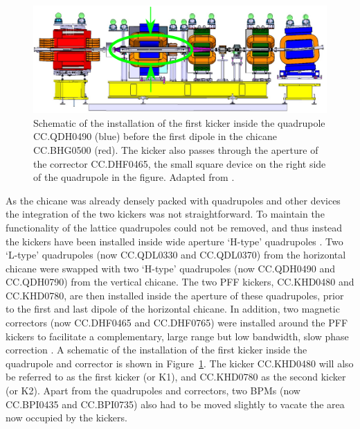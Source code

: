 \begin{figure}
  \centering
  \includegraphics[width=\textwidth]{Figures/optics/kickerInsideQuad}
  \caption{Schematic of the installation of the first kicker inside the quadrupole CC.QDH0490 (blue) before the first dipole in the chicane CC.BHG0500 (red). The kicker also passes through the aperture of the corrector CC.DHF0465, the small square device on the right side of the quadrupole in the figure. Adapted from \cite{kickInQuad}.}
  \label{f:kickerInsideQuad}
\end{figure}

As the chicane was already densely packed with quadrupoles and other devices the integration of the two kickers was not straightforward. To maintain the functionality of the lattice quadrupoles could not be removed, and thus instead the kickers have been installed inside wide aperture `H-type' quadrupoles \cite{tl2Magnets}. Two `L-type'  quadrupoles \cite{tl2Magnets} (now CC.QDL0330 and CC.QDL0370) from the horizontal chicane were swapped with two `H-type' quadrupoles (now CC.QDH0490 and CC.QDH0790) from the vertical chicane. The two PFF kickers, CC.KHD0480 and CC.KHD0780, are then installed inside the aperture of these quadrupoles, prior to the first and last dipole of the horizontal chicane. In addition, two magnetic correctors (now CC.DHF0465 and CC.DHF0765) were installed around the PFF kickers to facilitate a complementary, large range but low bandwidth, slow phase correction \cite{jackLCWS14}. A schematic of the installation of the first kicker inside the quadrupole and corrector is shown in Figure~\ref{f:kickerInsideQuad}. The kicker CC.KHD0480 will also be referred to as the first kicker (or K1), and CC.KHD0780 as the second kicker (or K2). Apart from the quadrupoles and correctors, two BPMs (now CC.BPI0435 and CC.BPI0735) also had to be moved slightly to vacate the area now occupied by the kickers. %


